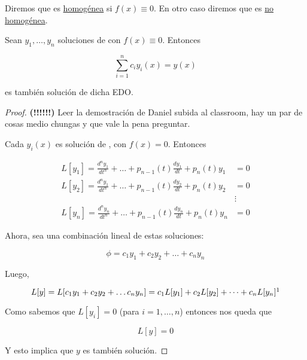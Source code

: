\begin{defn}
    Diremos que  es \ul{homogénea} si $f(x) \equiv 0$. En otro caso diremos que es \ul{no homogénea}.
\end{defn}

\begin{pro}
    Sean $y_1, \dots, y_n$ soluciones de  con $f(x) \equiv 0$. Entonces

    \begin{equation}\label{eq:combinacionl}
        \sum_{i=1}^{n} c_i y_i(x) = y(x)
    \end{equation}

    \noindent es también solución de dicha EDO.
\end{pro}

\begin{proof}
    \textbf{(!!!!!!)} Leer la demostración de Daniel subida al classroom, hay un par de cosas medio chungas y que vale la pena preguntar.

    Cada $y_i(x)$ es solución de , con $f(x) = 0$. Entonces

    \begin{equation*}
        \begin{aligned}
            L[y_1] = \frac{d^ny_1}{dt^n} + \dots + p_{n-1}(t)\frac{dy_1}{dt} + p_n(t)y_1 &= 0 \\
            L[y_2] = \frac{d^ny_1}{dt^n} + \dots + p_{n-1}(t)\frac{dy_2}{dt} + p_n(t)y_2 &= 0 \\
            &\vdots \\
            L[y_n] = \frac{d^ny_n}{dt^n} + \dots + p_{n-1}(t)\frac{dy_n}{dt} + p_n(t)y_n &= 0
        \end{aligned}
    \end{equation*}

    Ahora, sea una combinación lineal de estas soluciones:

    \[
        \phi = c_1y_1 + c_2y_2 + \dots + c_ny_n
    \]

    Luego,

    \[
        L[y] = L[c_1y_1 + c_2y_2 + \dots c_ny_n] = c_1L[y_1] + c_2L[y_2] + \dots + c_nL[y_n]\footnotemark
    \]

    Como sabemos que $L[y_i] = 0$ (para $i=1,\dots,n$) entonces nos queda que

    \[
        L[y] = 0
    \]

    Y esto implica que $y$ es también solución.
\end{proof}

